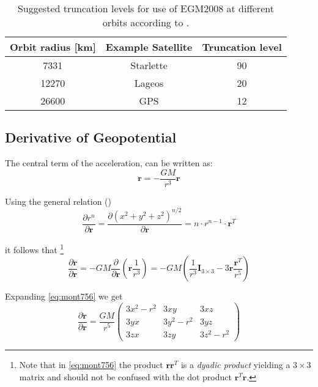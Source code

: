 \begin{table}
\centering
\begin{tabular}{c c c}
 \hline
 Orbit radius [km] & Example Satellite & Truncation level \\
 \hline
  7331  & Starlette & 90 \\
  12270 & Lageos    & 20 \\
  26600 & GPS       & 12 \\
 \hline
\end{tabular}
\caption{Suggested truncation levels for use of EGM2008 at different orbits according to \cite{iers2010}.}
\label{table:egm2008-truncation-levels}
\end{table}

\subsection{Derivative of Geopotential}
\label{ssec:derivative-of-geopotential}
The central term of the acceleration, can be written as:
\begin{equation}
  \label{eq:mont754}
  \ddot{\bm{r}} = - \frac{GM}{r^3} \bm{r}
\end{equation}

Using the general relation (\cite{Montenbruck2000}) 
\begin{equation}
  \label{eq:mont755}
  \frac{\partial r^n}{\partial \bm{r}} = 
    \frac{\partial \left( x^2 + y^2 + z^2 \right) ^{n/2}}{\partial \bm{r}} = 
    n \cdot r^{n-1} \cdot \bm{r}^T
\end{equation}

it follows that \footnote{Note that in \ref{eq:mont756} the product $\bm{r} \bm{r}^T$ is 
a \emph{dyadic product} yielding a $3\times 3$ matrix and should not be confused 
with the dot product $\bm{r}^T \bm{r}$.}
\begin{equation}
  \label{eq:mont756}
  \frac{\partial \ddot{\bm{r}}}{\partial \bm{r}} = 
  -GM \frac{\partial}{\partial \bm{r}} \left( \bm{r} \frac{1}{r^3} \right) =
  -GM \left( \frac{1}{r^3} \bm{I}_{3 \times 3} -3 \bm{r} \frac{\bm{r}^T}{r^5} \right)
\end{equation}

Expanding \ref{eq:mont756} we get
\begin{equation}
  \label{eq:mont757}
  \frac{\partial \ddot{\bm{r}}}{\partial \bm{r}} =
    \frac{GM}{r^5}
      \begin{pmatrix}
        3 x^2 - r^2 & 3xy         & 3xz \\
        3yx         & 3 y^2 - r^2 & 3yz \\
        3zx         & 3zy         & 3 z^2 - r^2
      \end{pmatrix}
\end{equation}

